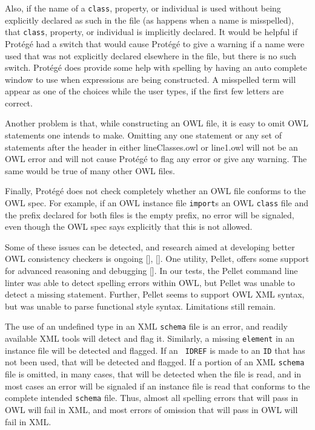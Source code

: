 \documentclass[preprint,12pt]{elsarticle}
\begin{document}
Also, if the name of a {\tt class}, property, or individual is used without
being explicitly declared as such in the file (as happens when a name is
misspelled), that {\tt class}, property, or individual is implicitly
declared. It would be helpful if Prot\'eg\'e had a switch that would cause
Prot\'eg\'e to give a warning if a name were used that was not explicitly
declared elsewhere in the file, but there is no such switch. Prot\'eg\'e
does provide some help with spelling by having an auto complete window to
use when expressions are being constructed. A misspelled term will appear
as one of the choices while the user types, if the first few letters are
correct.

Another problem is that, while constructing an OWL file, it is easy to omit
OWL statements one intends to make. Omitting any one statement or any set
of statements after the header in either lineClasses.owl or line1.owl will
not be an OWL error and will not cause Prot\'eg\'e to flag any error or
give any warning. The same would be true of many other OWL files.

Finally, Prot\'eg\'e does not check completely whether an OWL file conforms
to the OWL spec. For example, if an OWL instance file {\tt import}s an OWL
{\tt class} file and the prefix declared for both files is the empty
prefix, no error will be signaled, even though the OWL spec says explicitly
that this is not allowed.

Some of these issues can be detected, and research aimed at developing
better OWL consistency checkers is ongoing [],
[]. One utility, Pellet, offers some support
for advanced reasoning and debugging []. In our tests,
the Pellet command line linter was able to detect spelling errors
within OWL, but Pellet was unable to detect a missing statement.
Further, Pellet seems to support OWL XML syntax, but was unable to
parse functional style syntax. Limitations still remain.

The use of an undefined type in an XML {\tt schema} file is an error, and
readily available XML tools will detect and flag it. Similarly, a missing
{\tt element} in an instance file will be detected and flagged. If an {\tt
  IDREF} is made to an {\tt ID} that has not been used, that will be
detected and flagged. If a portion of an XML {\tt schema} file is omitted,
in many cases, that will be detected when the file is read, and in most
cases an error will be signaled if an instance file is read that conforms
to the complete intended {\tt schema} file. Thus, almost all spelling
errors that will pass in OWL will fail in XML, and most errors of omission
that will pass in OWL will fail in XML.
\end{document}
